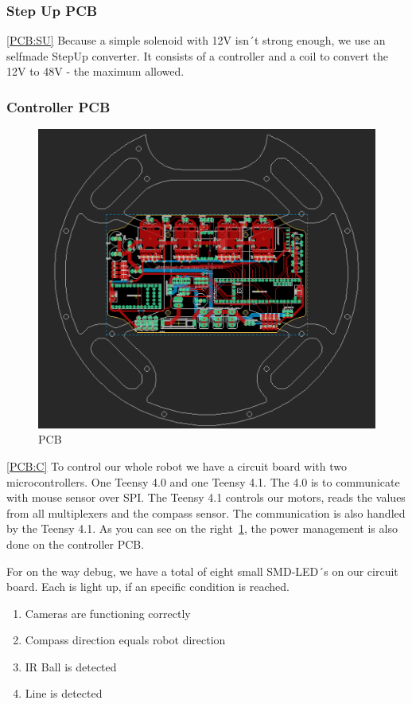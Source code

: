 \documentclass{scrartcl}
\begin{document}
\subsubsection{Step Up PCB}
\ref{PCB:SU} Because a simple solenoid with 12V isn´t strong enough, we use an selfmade 
StepUp converter. It consists of a controller and a coil to convert the 12V
to 48V - the maximum allowed.
\newline

\subsubsection{Controller PCB}

\begin{figure}
    \centering
    \includegraphics[width=0.75\linewidth]{img/eagle/ControllerPCB.png}
    \caption{PCB}
    \label{fig:CPCB}
\end{figure}

\ref{PCB:C} To control our whole robot we have a circuit board with two microcontrollers. One Teensy 4.0 and one Teensy 4.1. The 4.0 is to communicate with
mouse sensor over SPI. The Teensy 4.1 controls our motors, reads the values from all multiplexers and the compass sensor. The communication is also 
handled by the Teensy 4.1. 
\newline
As you can see on the right~\ref{fig:CPCB}, the power management is also done on the controller PCB.
\newpage

For on the way debug, we have a total of eight small SMD-LED´s on our circuit board.
Each is light up, if an specific condition is reached.
\begin{enumerate}
    \item{Cameras are functioning correctly}
    \item{Compass direction equals robot direction}
    \item{IR Ball is detected}
    \item{Line is detected}
\end{enumerate}
\end{document}
